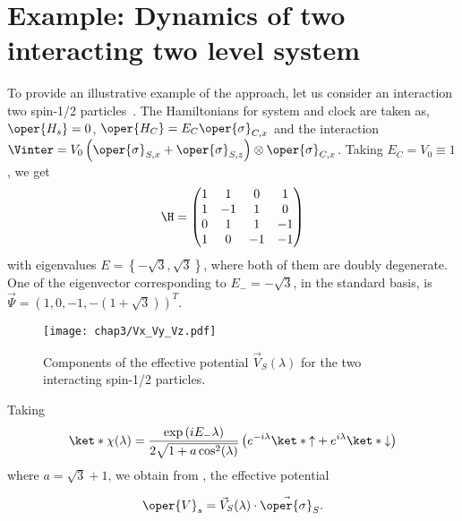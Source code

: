 \section{Example: Dynamics of two interacting two level system\label{sec:chap3_2spin_interact}}

To provide an illustrative example of the approach, let us consider an interaction two spin-1/2 particles~\cite{Gemsheim:2023izg}.
The Hamiltonians for system and clock are taken as, \(\oper{H_s} = 0\), \(\oper{H_C} = E_C\oper{\sigma}_{C, x}\)
and the interaction 
\(\Vinter = V_0\left(\oper{\sigma}_{S, x} + \oper{\sigma}_{S, z}\right)\otimes \oper{\sigma}_{C, x}\). 
Taking \(E_C = V_0 \equiv 1\), we get
\begin{equation}
    \H = \begin{pmatrix}
        1 & 1 & 0 & 1 \\
        1 & -1 & 1 & 0 \\
        0 & 1 & 1 & -1 \\
        1 & 0 & -1 & -1
        \end{pmatrix}
\end{equation}
with eigenvalues \(E = \left\{-\sqrt{3}, \sqrt{3}\right\}\), 
where both of them are doubly degenerate. One of the eigenvector
corresponding to \(E_- = -\sqrt{3}\), in the standard basis, is
\(\vec{\Psi} = \left(1, 0, -1, -(1 + \sqrt{3})\right)^T\).
\begin{figure}[!h]
    \centering
    \texttt{[image: chap3/Vx\_Vy\_Vz.pdf]}
    \caption{Components of the effective potential \(\vec{V}_S(\lambda)\) for the two interacting spin-1/2 particles.}
    \label{fig:chap3_effective_potential}
\end{figure}


Taking
\begin{equation}
    \ket*{\chi(\lambda)} = 
    \frac{\exp\left(i E_- \lambda\right)}{
        2\sqrt{1 + a \cos^2(\lambda)}} \left(e^{-i\lambda} \ket*{\uparrow} + e^{i\lambda} \ket*{\downarrow} \right)
\end{equation} 
where \(a = \sqrt{3} + 1\), we obtain from , the effective potential

\begin{equation}
    \oper{V}_s = \vec{V}_S(\lambda)\cdot\vec{\oper{\sigma}}_S. 
\end{equation}

